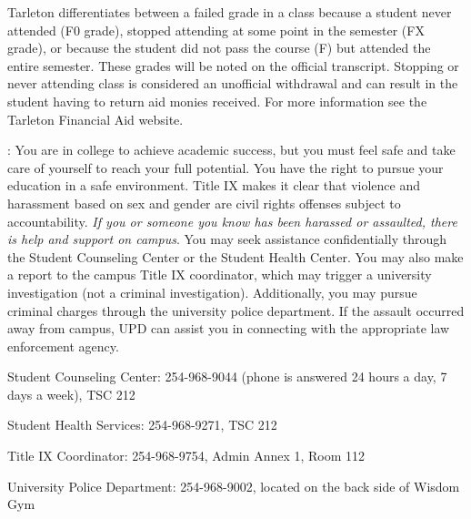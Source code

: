 \documentclass[letterpaper]{article}
\begin{document}
 Tarleton differentiates between a failed grade in a class because a student never attended (F0 grade), stopped attending at some point in the semester (FX grade), or because the student did not pass the course (F) but attended the entire semester. These grades will be noted on the official transcript. Stopping or never attending class is considered an unofficial withdrawal and can result in the student having to return aid monies received.  For more information see the Tarleton Financial Aid website.




: You are in college to achieve academic success, but you must feel safe and take care of yourself to reach your full potential. You have the right to pursue your education in a safe environment. Title IX makes it clear that violence and harassment based on sex and gender are civil rights offenses subject to accountability. \textit{If you or someone you know has been harassed or assaulted, there is help and support on campus}. You may seek assistance confidentially through the Student Counseling Center or the Student Health Center. You may also make a report to the campus Title IX coordinator, which may trigger a university investigation (not a criminal investigation). Additionally, you may pursue criminal charges through the university police department. If the assault occurred away from campus, UPD can assist you in connecting with the appropriate law enforcement agency.
\begin{center}
Student Counseling Center: 254-968-9044 (phone is answered 24 hours a day, 7 days a week), TSC 212

Student Health Services: 254-968-9271, TSC 212 

Title IX Coordinator: 254-968-9754, Admin Annex 1, Room 112

University Police Department: 254-968-9002, located on the back side of Wisdom Gym
\end{center}
\end{document}
